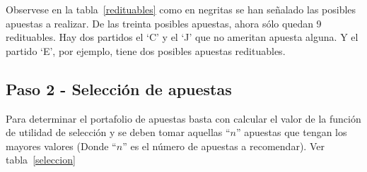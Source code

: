 \begin{table}[ht]
\centering
{}
\caption{Escogiendo apuestas que vale la pena realizar}
\label{redituables}
\end{table}

Observese en la tabla~\ref{redituables} como en negritas se han señalado las posibles apuestas a realizar. De las treinta posibles apuestas, ahora sólo quedan 9 redituables. Hay dos partidos el `C' y el `J' que no ameritan apuesta alguna. Y el partido `E', por ejemplo, tiene dos posibles apuestas redituables.

\subsection{Paso 2 - Selección de apuestas}
\label{sec:paso-2}


Para determinar el portafolio de apuestas basta con calcular el valor de la función de utilidad de selección y se deben tomar aquellas ``$n$'' apuestas que tengan los mayores valores (Donde ``$n$'' es el número de apuestas a recomendar).
Ver tabla~\ref{seleccion}

